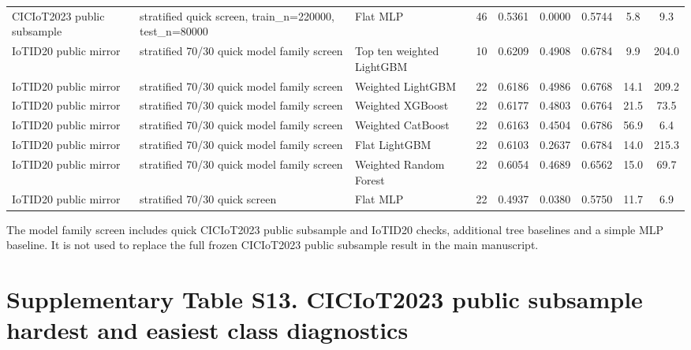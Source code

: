 \documentclass[10pt]{article}
\begin{document}
\begin{center}
\begin{longtable}{p{2.1cm}p{3.0cm}p{2.4cm}cccccc}
CICIoT2023 public subsample & stratified quick screen, train\_n=220000, test\_n=80000 & Flat MLP & 46 & 0.5361 & 0.0000 & 0.5744 & 5.8 & 9.3 \\
IoTID20 public mirror & stratified 70/30 quick model family screen & Top ten weighted LightGBM & 10 & 0.6209 & 0.4908 & 0.6784 & 9.9 & 204.0 \\
IoTID20 public mirror & stratified 70/30 quick model family screen & Weighted LightGBM & 22 & 0.6186 & 0.4986 & 0.6768 & 14.1 & 209.2 \\
IoTID20 public mirror & stratified 70/30 quick model family screen & Weighted XGBoost & 22 & 0.6177 & 0.4803 & 0.6764 & 21.5 & 73.5 \\
IoTID20 public mirror & stratified 70/30 quick model family screen & Weighted CatBoost & 22 & 0.6163 & 0.4504 & 0.6786 & 56.9 & 6.4 \\
IoTID20 public mirror & stratified 70/30 quick model family screen & Flat LightGBM & 22 & 0.6103 & 0.2637 & 0.6784 & 14.0 & 215.3 \\
IoTID20 public mirror & stratified 70/30 quick model family screen & Weighted Random Forest & 22 & 0.6054 & 0.4689 & 0.6562 & 15.0 & 69.7 \\
IoTID20 public mirror & stratified 70/30 quick screen & Flat MLP & 22 & 0.4937 & 0.0380 & 0.5750 & 11.7 & 6.9 \\
\bottomrule
\end{longtable}
\end{center}

The model family screen includes quick CICIoT2023 public subsample and IoTID20 checks, additional tree baselines and a simple MLP baseline. It is not used to replace the full frozen CICIoT2023 public subsample result in the main manuscript.

\section*{Supplementary Table S13. CICIoT2023 public subsample hardest and easiest class diagnostics}
\end{document}
